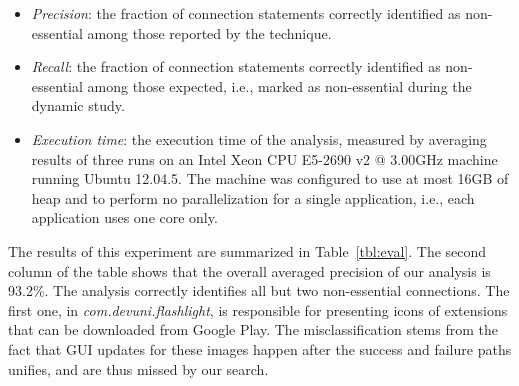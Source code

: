 \begin{itemize}[leftmargin=0.5cm]%
\item \emph{Precision}: the fraction of connection statements correctly identified as non-essential among those reported by the technique.
\item \emph{Recall}: the fraction of connection statements correctly identified as non-essential among those expected, i.e., marked as non-essential during the dynamic study. 
\item \emph{Execution time}: the execution time of the analysis, measured by averaging results of
three runs on an Intel\textsuperscript{\textregistered} Xeon\textsuperscript{\textregistered} CPU E5-2690 v2 @ 3.00GHz machine running Ubuntu 12.04.5. The machine was configured to use at most 16GB of heap and to perform no parallelization for a single application, i.e., each application uses one core only.
\end{itemize}
  
The results of this experiment are summarized in Table~\ref{tbl:eval}.  
The second column of the table shows that the overall averaged precision of our analysis is 93.2\%. 
The analysis correctly identifies all but two non-essential connections. 
The first one, in \emph{com.devuni.flashlight}, is responsible for presenting icons of extensions that can be downloaded from Google Play. The misclassification stems from the fact that GUI updates for these images happen after the success and failure paths unifies, and are thus missed by our search. 

